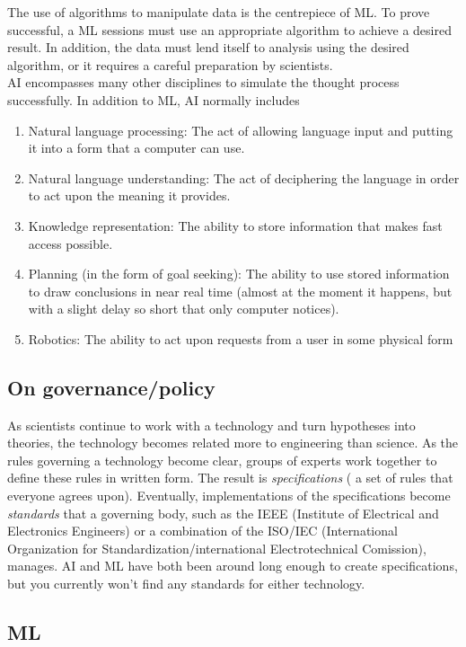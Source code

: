 \begin{enumerate}
	The use of algorithms to manipulate data is the centrepiece of ML. To prove successful, a ML sessions must use an appropriate algorithm to achieve a desired result. In addition, the data must lend itself to analysis using the desired algorithm, or it requires a careful preparation by scientists. \\
	AI encompasses many other disciplines to simulate the thought process successfully. In addition to ML, AI normally includes 
	\begin{enumerate}
		\item Natural language processing: The act of allowing language input and putting it into a form that a computer can use.
		\item Natural language understanding: The act of deciphering the language in order to act upon the meaning it provides.
		\item Knowledge representation: The ability to store information that makes fast access possible.
		\item Planning (in the form of goal seeking): The ability to use stored information to draw conclusions in near real time (almost at the moment it happens, but with a slight delay so short that only computer notices).
		\item Robotics: The ability to act upon requests from a user in some physical form
	\end{enumerate}
	
\end{enumerate}
\subsection{On governance/policy}
As scientists continue to work with a technology and turn hypotheses into theories, the technology becomes related more to engineering than science. As the rules governing a technology become clear, groups of experts work together to define these rules in written form. The result is \emph{specifications} ( a set of rules that everyone agrees upon). Eventually, implementations of the specifications become \emph{standards} that a governing body, such as the IEEE (Institute of Electrical and Electronics Engineers) or a combination of the ISO/IEC (International Organization for Standardization/international Electrotechnical Comission), manages. AI and ML have both been around long enough to create specifications, but you currently won't find any standards for either technology.

\subsection{ML}
